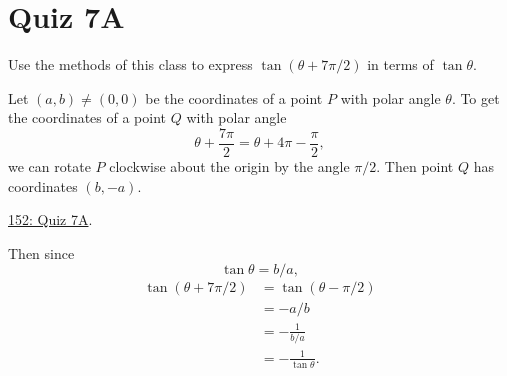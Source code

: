 \documentclass{ximera}
\begin{document}
\section{Quiz 7A}
\begin{question} \label{Q7A142}
Use the methods of this class to express $\tan(\theta + 7\pi/2)$ in terms of $\tan\theta$.

\begin{explanation}
Let $(a,b)\neq (0,0)$ be the coordinates of a point $P$ with polar angle $\theta$. To get the coordinates of a point $Q$ with polar angle 
\[
 \theta + \frac{7\pi}{2}  = \theta + 4\pi - \frac{\pi}{2},
\]
we can rotate $P$ clockwise about the origin by the angle $\pi/2$. Then point $Q$ has coordinates $(b,-a)$.

\begin{onlineOnly}
    \begin{center}
\end{center}
\end{onlineOnly}
 
\href{https://www.desmos.com/calculator/3lpfrhwcxp}{152: Quiz 7A}.

Then since
\[
  \tan\theta = b/a,
\]
\begin{align*}
  \tan \left( \theta + 7\pi/2  \right) &= \tan (\theta - \pi/2) \\
                                                  &= -a/b  \\
                                                   &= - \frac{1}{b/a} \\
                                                  &= - \frac{1}{\tan \theta}.
\end{align*}

\end{explanation}
\end{question}
\end{document}
